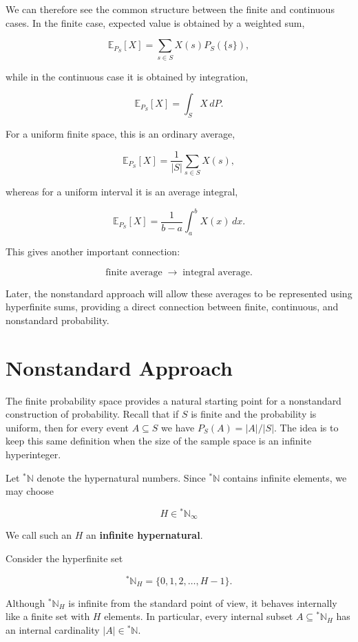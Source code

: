 \documentclass[10pt,a4paper]{book}
\begin{document}
We can therefore see the common structure between the finite and continuous cases. In the finite case, expected value is obtained by a weighted sum,

$$
    \mathbb E_{P_S}[X]=\sum_{s\in S}X(s)P_S(\{s\}),
$$

while in the continuous case it is obtained by integration,

$$
    \mathbb E_{P_S}[X]=\int_S X\,dP.
$$

For a uniform finite space, this is an ordinary average,

$$
    \mathbb E_{P_S}[X]=\frac1{|S|}\sum_{s\in S}X(s),
$$

whereas for a uniform interval it is an average integral,

$$
    \mathbb E_{P_S}[X]=\frac1{b-a}\int_a^bX(x)\,dx.
$$

This gives another important connection:

$$
    \text{finite average}
    \;\longrightarrow\;
    \text{integral average}.
$$

Later, the nonstandard approach will allow these averages to be represented using hyperfinite sums, providing a direct connection between finite, continuous, and nonstandard probability.

\section{Nonstandard Approach}

The finite probability space provides a natural starting point for a nonstandard construction of probability. Recall that if $S$ is finite and the probability is uniform, then for every event $A\subseteq S$ we have $P_S(A)=|A|/|S|$. The idea is to keep this same definition when the size of the sample space is an infinite hyperinteger.

Let ${}^*\mathbb{N}$ denote the hypernatural numbers. Since ${}^*\mathbb{N}$ contains infinite elements, we may choose

$$
    H\in{}^*\mathbb{N}_\infty
$$

We call such an $H$ an \textbf{infinite hypernatural}.

Consider the hyperfinite set

$$
    {}^*\mathbb{N}_H=\{0,1,2,\ldots,H -1\}.
$$

Although ${}^*\mathbb{N}_H$ is infinite from the standard point of view, it behaves internally like a finite set with $H$ elements. In particular, every internal subset $A\subseteq {}^*\mathbb{N}_H$ has an internal cardinality $|A|\in{}^*\mathbb{N}$.
\end{document}
